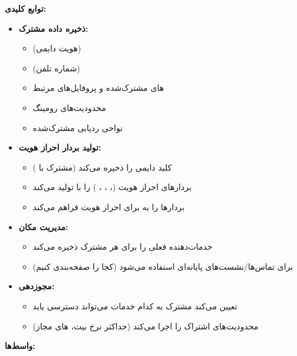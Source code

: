 \textbf{توابع کلیدی:}

\begin{itemize}
\tightlist
\item
  \textbf{ذخیره داده مشترک:}

  \begin{itemize}
  \tightlist
  \item
     (هویت دایمی)
  \item
     (شماره تلفن)
  \item
    های مشترک‌شده و پروفایل‌های  مرتبط
  \item
    محدودیت‌های رومینگ
  \item
    نواحی ردیابی مشترک‌شده
  \end{itemize}
\item
  \textbf{تولید بردار احراز هویت:}

  \begin{itemize}
  \tightlist
  \item
    کلید دایمی  را ذخیره می‌کند (مشترک با )
  \item
    بردارهای احراز هویت (، ، ، ) را با  تولید می‌کند
  \item
    بردارها را به  برای احراز هویت  فراهم می‌کند
  \end{itemize}
\item
  \textbf{مدیریت مکان:}

  \begin{itemize}
  \tightlist
  \item
     خدمات‌دهنده فعلی را برای هر مشترک ذخیره می‌کند
  \item
    برای تماس‌ها/\allowbreak{}نشست‌های پایانه‌ای استفاده می‌شود (کجا  را صفحه‌بندی کنیم)
  \end{itemize}
\item
  \textbf{مجوزدهی:}

  \begin{itemize}
  \tightlist
  \item
    تعیین می‌کند مشترک به کدام خدمات می‌تواند دسترسی یابد
  \item
    محدودیت‌های اشتراک را اجرا می‌کند (حداکثر نرخ بیت، های مجاز)
  \end{itemize}
\end{itemize}

\textbf{واسط‌ها:}

